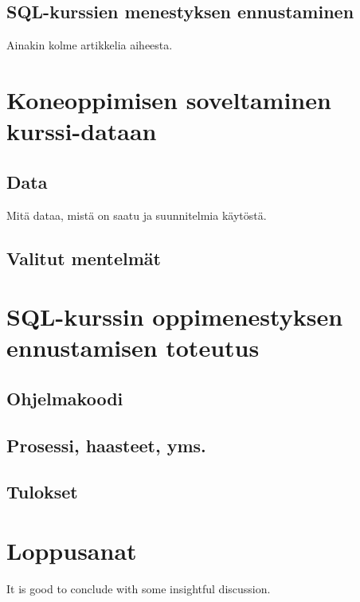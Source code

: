 \documentclass[finnish,twoside,openright]{HYgraduMLDS}
\begin{document}
\section{SQL-kurssien menestyksen ennustaminen}

Ainakin kolme artikkelia aiheesta.


\chapter{Koneoppimisen soveltaminen kurssi-dataan}

\section{Data}

Mitä dataa, mistä on saatu ja suunnitelmia käytöstä.


\section{Valitut mentelmät}


\chapter{SQL-kurssin oppimenestyksen ennustamisen toteutus}

\section{Ohjelmakoodi}


\section{Prosessi, haasteet, yms.}


\section{Tulokset}


\chapter{Loppusanat\label{chapter:Loppusanat}}

It is good to conclude with some insightful discussion. 

\end{document}

